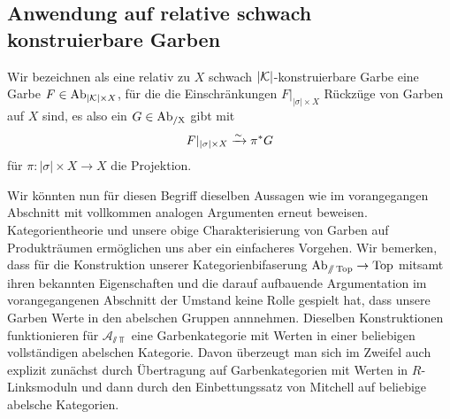 \subsection{Anwendung auf relative schwach konstruierbare Garben} 

Wir bezeichnen als eine relativ zu $X$ schwach $|\mathcal{K}|$-konstruierbare
Garbe eine Garbe $F \in \operatorname{Ab}_{|\mathcal{K}| \times X}$, für die die
Einschränkungen $F|_{|\sigma| \times X}$ Rückzüge von Garben auf $X$
sind, es also ein $G \in \operatorname{Ab_{/X}}$ gibt mit
\[ F|_{|\sigma| \times X} \xrightarrow[]{\sim} \pi^* G \]
für $\pi: |\sigma| \times X \to X$ die Projektion.

Wir könnten nun für diesen Begriff dieselben Aussagen wie im
vorangegangen Abschnitt mit vollkommen analogen Argumenten erneut
beweisen. Kategorientheorie und unsere obige Charakterisierung von
Garben auf Produkträumen ermöglichen uns aber ein einfacheres
Vorgehen. Wir bemerken, dass für die Konstruktion unserer
Kategorienbifaserung $\operatorname{Ab}_{\mathbin{/\mkern-6mu/} \operatorname{Top}} \to \operatorname{Top}$ mitsamt ihren
bekannten Eigenschaften und die darauf aufbauende Argumentation im
vorangegangenen Abschnitt der Umstand keine Rolle gespielt hat, dass
unsere Garben Werte in den abelschen Gruppen annnehmen. Dieselben
Konstruktionen funktionieren für $\mathcal{A}_{\sslash \Top}$ eine
Garbenkategorie mit Werten in einer beliebigen vollständigen abelschen
Kategorie. Davon überzeugt man sich im Zweifel auch explizit zunächst
durch Übertragung auf Garbenkategorien mit Werten in $R$-Linksmoduln
und dann durch den Einbettungssatz von Mitchell auf beliebige abelsche
Kategorien.

